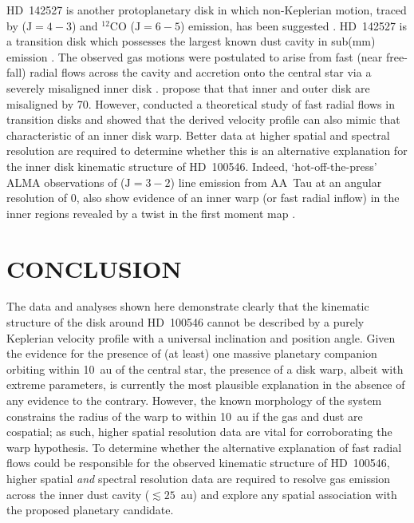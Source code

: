\documentclass[onecolumn]{aastex6}
\begin{document}
HD~142527 is another protoplanetary disk in which  non-Keplerian motion, traced
by  ($\mathrm{J}=4-3$) and $^{12}$CO ($\mathrm{J}=6-5$) emission, has
been suggested \citep{casassus13,casassus15}. HD~142527 is a transition disk
which possesses the largest known dust cavity in sub(mm) emission
\citep[$\approx 140$~au][]{casassus13,fukagawa13}. The observed gas motions were
postulated to arise from fast (near free-fall) radial flows across the cavity
and accretion onto the central star via a severely misaligned inner disk
\citep{casassus13,casassus15,marino15}. \citet{marino15} propose that that inner
and outer disk are misaligned by 70\degree. However, \citet{rosenfeld14}
conducted a theoretical study of fast radial flows in transition disks and
showed that the derived velocity profile can also mimic that characteristic of
an inner disk warp. Better data at higher spatial and spectral resolution are
required to determine whether this is an alternative explanation for the inner
disk kinematic structure of HD~100546. Indeed, `hot-off-the-press' ALMA
observations of  ($\mathrm{J}=3-2$) line emission from AA~Tau at an
angular resolution of 0, also show evidence of an inner warp (or fast
radial inflow) in the inner regions revealed by a twist in the first moment map
\citep{loomis17}.

\section{CONCLUSION}
\label{conclusion}

The data and analyses shown here demonstrate clearly that the kinematic
structure of the disk around HD~100546 cannot be described by a purely Keplerian
velocity profile with a universal inclination and position angle. Given the
evidence for the presence of (at least) one massive planetary companion orbiting
within 10~au of the central star, the presence of a disk warp, albeit with
extreme parameters, is currently the most plausible explanation in the absence
of any evidence to the contrary. However, the known morphology of the system
constrains the radius of the warp to within 10~au if the gas and dust are
cospatial; as such, higher spatial resolution data are vital for corroborating
the warp hypothesis. To determine whether the alternative explanation of fast radial flows could be responsible for the observed kinematic structure of HD~100546, higher spatial {\em and} spectral resolution data are required to resolve gas emission across the inner dust cavity ($\lesssim 25$~au) and explore any spatial association with the proposed planetary candidate.
\end{document}
